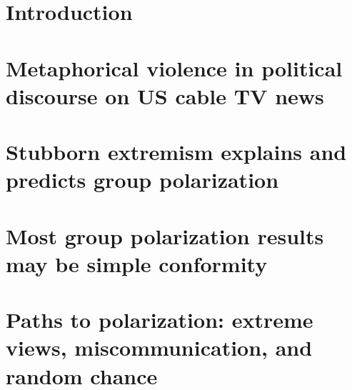 \documentclass[12pt,chapterheads]{UCMerced}
\begin{document}

%   
%   
\chapter{Introduction}



\chapter{Metaphorical violence in political discourse on US cable TV news}

% 


\chapter{Stubborn extremism explains and predicts group polarization}

% 


\chapter{Most group polarization results may be simple conformity}




\chapter{Paths to polarization: extreme views, miscommunication, and random chance}




\end{document}
